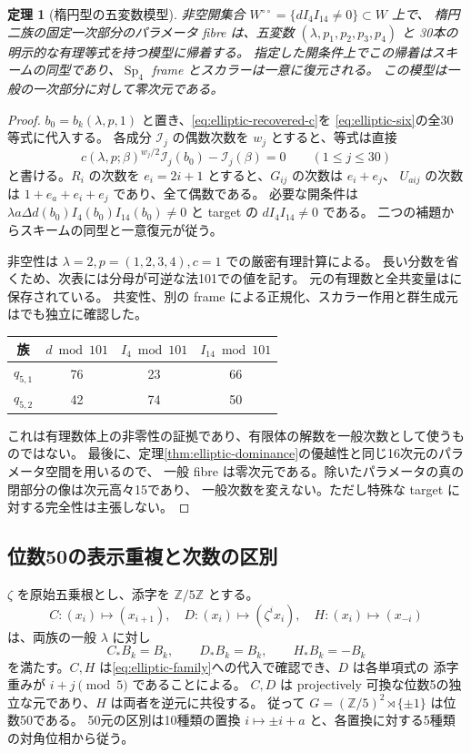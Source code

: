 \documentclass[11pt,a4paper]{ltjsarticle}
\DeclareMathOperator{\Sp}{Sp}
\newtheorem{theorem}{定理}[section]
\theoremstyle{remark}
\begin{document}
\begin{theorem}[楕円型の五変数模型]\label{thm:elliptic-five}
非空開集合 $W^{\circ\circ}=\{dI_4I_{14}\ne0\}\subset W$ 上で、
楕円二族の固定一次部分のパラメータ fibre は、五変数 $(\lambda,p_1,p_2,p_3,p_4)$ と
30本の明示的な有理等式を持つ模型に帰着する。
指定した開条件上でこの帰着はスキームの同型であり、$\Sp_4$ frame とスカラーは一意に復元される。
この模型は一般の一次部分に対して零次元である。
\end{theorem}
\begin{proof}
$b_0=b_k(\lambda,p,1)$ と置き、\eqref{eq:elliptic-recovered-c}を
\eqref{eq:elliptic-six}の全30等式に代入する。
各成分 $\mathcal I_j$ の偶数次数を $w_j$ とすると、等式は直接
\begin{equation}\label{eq:elliptic-five-equations}
 c(\lambda,p;\beta)^{w_j/2}\mathcal I_j(b_0)-\mathcal I_j(\beta)=0
 \qquad(1\le j\le30)
\end{equation}
と書ける。$R_i$ の次数を $e_i=2i+1$ とすると、$G_{ij}$ の次数は $e_i+e_j$、
$U_{aij}$ の次数は $1+e_a+e_i+e_j$ であり、全て偶数である。
必要な開条件は $\lambda a\Delta d(b_0)I_4(b_0)I_{14}(b_0)\ne0$ と
target の $dI_4I_{14}\ne0$ である。
二つの補題からスキームの同型と一意復元が従う。

非空性は $\lambda=2,p=(1,2,3,4),c=1$ での厳密有理計算による。
長い分数を省くため、次表には分母が可逆な法101での値を記す。
元の有理数と全共変量は\cite{elliptic-five-certificate}に保存されている。
共変性、別の frame による正規化、スカラー作用と群生成元は\cite{elliptic-five-review}でも独立に確認した。
\begin{center}
\begin{tabular}{@{}cccc@{}}
\toprule
族 & $d\bmod101$ & $I_4\bmod101$ & $I_{14}\bmod101$\\\midrule
$q_{5,1}$ & 76 & 23 & 66\\
$q_{5,2}$ & 42 & 74 & 50\\\bottomrule
\end{tabular}
\end{center}
これは有理数体上の非零性の証拠であり、有限体の解数を一般次数として使うものではない。
最後に、定理\ref{thm:elliptic-dominance}の優越性と同じ16次元のパラメータ空間を用いるので、
一般 fibre は零次元である。除いたパラメータの真の閉部分の像は次元高々15であり、
一般次数を変えない。ただし特殊な target に対する完全性は主張しない。
\end{proof}

\subsection{位数50の表示重複と次数の区別}
$\zeta$ を原始五乗根とし、添字を $\mathbb Z/5\mathbb Z$ とする。
\[
 C:(x_i)\mapsto(x_{i+1}),\quad
 D:(x_i)\mapsto(\zeta^ix_i),\quad
 H:(x_i)\mapsto(x_{-i})
\]
は、両族の一般 $\lambda$ に対し
\[
 C_*B_k=B_k,\qquad D_*B_k=B_k,\qquad H_*B_k=-B_k
\]
を満たす。$C,H$ は\eqref{eq:elliptic-family}への代入で確認でき、$D$ は各単項式の
添字重みが $i+j\pmod5$ であることによる。
$C,D$ は projectively 可換な位数5の独立な元であり、$H$ は両者を逆元に共役する。
従って $G=(\mathbb Z/5)^2\rtimes\{\pm1\}$ は位数50である。
50元の区別は10種類の置換 $i\mapsto\pm i+a$ と、各置換に対する5種類の対角位相から従う。
\end{document}
